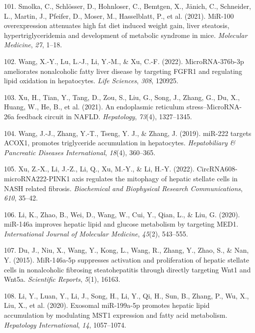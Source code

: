 \documentclass[
  11pt,
  letterpaper,
]{book}
\newlength{\cslhangindent}
\newenvironment{CSLReferences}[2] %
 {\begin{list}{}{%
  \setlength{\itemindent}{0pt}
  \setlength{\leftmargin}{0pt}
  \setlength{\parsep}{0pt}
  \ifodd #1
   \setlength{\leftmargin}{\cslhangindent}
   \setlength{\itemindent}{-1\cslhangindent}
  \fi
  \setlength{\itemsep}{#2\baselineskip}}}
 {\end{list}}
\begin{document}
\begin{CSLReferences}{1}{0}
101. Smolka, C., Schlösser, D., Hohnloser, C., Bemtgen, X., Jänich, C.,
Schneider, L., Martin, J., Pfeifer, D., Moser, M., Hasselblatt, P., et
al. (2021). MiR-100 overexpression attenuates high fat diet induced
weight gain, liver steatosis, hypertriglyceridemia and development of
metabolic syndrome in mice. \emph{Molecular Medicine}, \emph{27}, 1--18.

102. Wang, X.-Y., Lu, L.-J., Li, Y.-M., \& Xu, C.-F. (2022).
MicroRNA-376b-3p ameliorates nonalcoholic fatty liver disease by
targeting FGFR1 and regulating lipid oxidation in hepatocytes.
\emph{Life Sciences}, \emph{308}, 120925.

103. Xu, H., Tian, Y., Tang, D., Zou, S., Liu, G., Song, J., Zhang, G.,
Du, X., Huang, W., He, B., et al. (2021). An endoplasmic reticulum
stress--MicroRNA-26a feedback circuit in NAFLD. \emph{Hepatology},
\emph{73}(4), 1327--1345.

104. Wang, J.-J., Zhang, Y.-T., Tseng, Y. J., \& Zhang, J. (2019).
miR-222 targets ACOX1, promotes triglyceride accumulation in
hepatocytes. \emph{Hepatobiliary \& Pancreatic Diseases International},
\emph{18}(4), 360--365.

105. Xu, Z.-X., Li, J.-Z., Li, Q., Xu, M.-Y., \& Li, H.-Y. (2022).
CircRNA608-microRNA222-PINK1 axis regulates the mitophagy of hepatic
stellate cells in NASH related fibrosis. \emph{Biochemical and
Biophysical Research Communications}, \emph{610}, 35--42.

106. Li, K., Zhao, B., Wei, D., Wang, W., Cui, Y., Qian, L., \& Liu, G.
(2020). miR-146a improves hepatic lipid and glucose metabolism by
targeting MED1. \emph{International Journal of Molecular Medicine},
\emph{45}(2), 543--555.

107. Du, J., Niu, X., Wang, Y., Kong, L., Wang, R., Zhang, Y., Zhao, S.,
\& Nan, Y. (2015). MiR-146a-5p suppresses activation and proliferation
of hepatic stellate cells in nonalcoholic fibrosing steatohepatitis
through directly targeting Wnt1 and Wnt5a. \emph{Scientific Reports},
\emph{5}(1), 16163.

108. Li, Y., Luan, Y., Li, J., Song, H., Li, Y., Qi, H., Sun, B., Zhang,
P., Wu, X., Liu, X., et al. (2020). Exosomal miR-199a-5p promotes
hepatic lipid accumulation by modulating MST1 expression and fatty acid
metabolism. \emph{Hepatology International}, \emph{14}, 1057--1074.


\end{CSLReferences}
\end{document}
